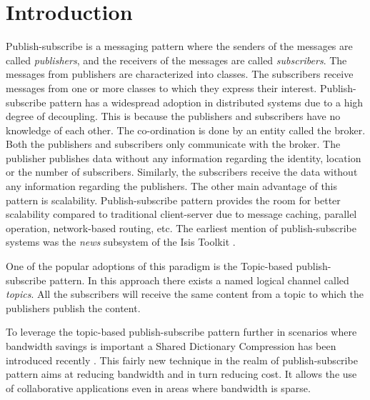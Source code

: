 \chapter{Introduction}\label{chapter:introduction}

Publish-subscribe is a messaging pattern where the senders of the messages are called \textit{publishers}, and the receivers of the messages are called \textit{subscribers}. The messages from publishers are characterized into classes. The subscribers receive messages from one or more classes to which they express their interest. Publish-subscribe pattern has a widespread adoption in distributed systems due to a high degree of decoupling. This is because the publishers and subscribers have no knowledge of each other. The co-ordination is done by an entity called the broker. Both the publishers and subscribers only communicate with the broker. The publisher publishes data without any information regarding the identity, location or the number of subscribers. Similarly, the subscribers receive the data without any information regarding the publishers. The other main advantage of this pattern is scalability. Publish-subscribe pattern provides the room for better scalability compared to traditional client-server due to message caching, parallel operation, network-based routing, etc. The earliest mention of publish-subscribe systems was the \textit{news} subsystem of the Isis Toolkit \parencite{Birman:1987:EVS:37499.37515}.

One of the popular adoptions of this paradigm is the Topic-based publish-subscribe pattern. In this approach there exists a named logical channel called \textit{topics}. All the subscribers will receive the same content from a topic to which the publishers publish the content.

To leverage the topic-based publish-subscribe pattern further in scenarios where bandwidth savings is important a Shared Dictionary Compression has been introduced recently \parencite{Doblander:2016:SDC}. This fairly new technique in the realm of publish-subscribe pattern aims at reducing bandwidth and in turn reducing cost. It allows the use of collaborative applications even in areas where bandwidth is sparse.